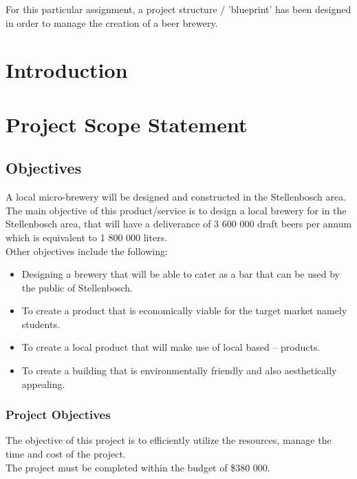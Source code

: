 \noindent
For this particular assignment, a project structure / 'blueprint' has been designed in order to manage the creation of a beer brewery.

\newpage
\tableofcontents
\listoffigures
\listoftables

\newpage
\section{Introduction}

\section{Project Scope Statement}
\subsection{Objectives}

A local micro-brewery will be designed and constructed in the Stellenbosch area. The main objective of this product/service is to design a local brewery for in the Stellenbosch area, that will have a deliverance of 3 600 000 draft beers per annum which is equivalent to 1 800 000 liters.\\

\noindent
Other objectives include the following:
\begin{itemize}
\item Designing a brewery that will be able to cater as a bar that can be used by the public of Stellenbosch.
\item To create a product that is economically viable for the target market namely students.
\item To create a local product that will make use of local based – products.
\item To create a building that is environmentally friendly and also aesthetically appealing.
\end{itemize}

\subsubsection{Project Objectives}

The objective of this project is to efficiently utilize the resources, manage the time and cost of the project.\\

\noindent
The project must be completed within the budget of \$380 000.\\


